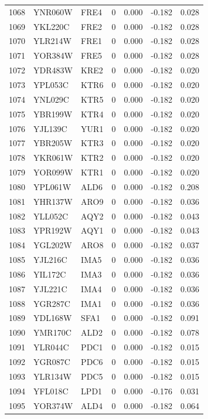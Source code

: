 \begin{longtable}{rllrrrr}
1068 & YNR060W & FRE4 & 0 & 0.000 & -0.182 & 0.028\\
1069 & YKL220C & FRE2 & 0 & 0.000 & -0.182 & 0.028\\
1070 & YLR214W & FRE1 & 0 & 0.000 & -0.182 & 0.028\\
1071 & YOR384W & FRE5 & 0 & 0.000 & -0.182 & 0.028\\
1072 & YDR483W & KRE2 & 0 & 0.000 & -0.182 & 0.020\\
1073 & YPL053C & KTR6 & 0 & 0.000 & -0.182 & 0.020\\
1074 & YNL029C & KTR5 & 0 & 0.000 & -0.182 & 0.020\\
1075 & YBR199W & KTR4 & 0 & 0.000 & -0.182 & 0.020\\
1076 & YJL139C & YUR1 & 0 & 0.000 & -0.182 & 0.020\\
1077 & YBR205W & KTR3 & 0 & 0.000 & -0.182 & 0.020\\
1078 & YKR061W & KTR2 & 0 & 0.000 & -0.182 & 0.020\\
1079 & YOR099W & KTR1 & 0 & 0.000 & -0.182 & 0.020\\
1080 & YPL061W & ALD6 & 0 & 0.000 & -0.182 & 0.208\\
1081 & YHR137W & ARO9 & 0 & 0.000 & -0.182 & 0.036\\
1082 & YLL052C & AQY2 & 0 & 0.000 & -0.182 & 0.043\\
1083 & YPR192W & AQY1 & 0 & 0.000 & -0.182 & 0.043\\
1084 & YGL202W & ARO8 & 0 & 0.000 & -0.182 & 0.037\\
1085 & YJL216C & IMA5 & 0 & 0.000 & -0.182 & 0.036\\
1086 & YIL172C & IMA3 & 0 & 0.000 & -0.182 & 0.036\\
1087 & YJL221C & IMA4 & 0 & 0.000 & -0.182 & 0.036\\
1088 & YGR287C & IMA1 & 0 & 0.000 & -0.182 & 0.036\\
1089 & YDL168W & SFA1 & 0 & 0.000 & -0.182 & 0.091\\
1090 & YMR170C & ALD2 & 0 & 0.000 & -0.182 & 0.078\\
1091 & YLR044C & PDC1 & 0 & 0.000 & -0.182 & 0.015\\
1092 & YGR087C & PDC6 & 0 & 0.000 & -0.182 & 0.015\\
1093 & YLR134W & PDC5 & 0 & 0.000 & -0.182 & 0.015\\
1094 & YFL018C & LPD1 & 0 & 0.000 & -0.176 & 0.031\\
1095 & YOR374W & ALD4 & 0 & 0.000 & -0.182 & 0.064\\

\end{longtable}
